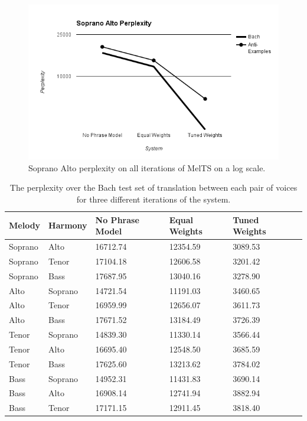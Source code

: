 \documentclass{sig-alternate}
\begin{document}
\begin{figure}
  \includegraphics[scale=0.5]{soprano_alto_perplexity}
  \caption{Soprano Alto perplexity on all iterations of MelTS on a log scale.}
\end{figure}


\begin{table}[t]
      \begin{tabular}{| l | l | l | l | l | l |}
      \hline
     Melody & Harmony & No Phrase Model & Equal Weights & Tuned Weights \\ \hline
     Soprano & Alto & 16712.74 & 12354.59 & 3089.53 \\ 
     Soprano & Tenor & 17104.18 & 12606.58 & 3201.42 \\ 
     Soprano & Bass & 17687.95 & 13040.16 & 3278.90 \\ 
     Alto & Soprano & 14721.54 & 11191.03 & 3460.65 \\ 
     Alto & Tenor & 16959.99 & 12656.07 & 3611.73 \\ 
     Alto & Bass & 17671.52 & 13184.49 & 3726.39 \\ 
     Tenor & Soprano & 14839.30 & 11330.14 & 3566.44 \\ 
     Tenor & Alto & 16695.40 & 12548.50 & 3685.59 \\ 
     Tenor & Bass & 17625.60 & 13213.62 & 3784.02 \\ 
     Bass & Soprano & 14952.31 & 11431.83 & 3690.14 \\ 
     Bass & Alto & 16908.14 & 12741.94 & 3882.94 \\ 
     Bass & Tenor & 17171.15 & 12911.45 & 3818.40 \\ \hline
      \end{tabular}
  \caption{The perplexity over the Bach test set of translation between each pair of voices for three different iterations of the system.}
\end{table}
\end{document}
